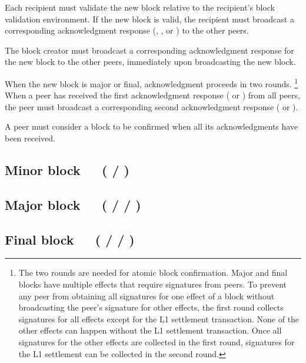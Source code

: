 \documentclass[../hydrozoa.tex]{subfiles}
\begin{document}
Each recipient must validate the new block relative to the recipient's block validation environment. If the new block is valid, the recipient must broadcast a corresponding acknowledgment response (, , or ) to the other peers.

The block creator must broadcast a corresponding acknowledgment response for the new block to the other peers, immediately upon broadcasting the new block.

When the new block is major or final, acknowledgment proceeds in two rounds.%
\footnote{The two rounds are needed for atomic block confirmation.
  Major and final blocks have multiple effects that require signatures from peers.
  To prevent any peer from obtaining all signatures for one effect of a block without broadcasting the peer's signature for other effects, the first round collects signatures for all effects except for the L1 settlement transaction.
  None of the other effects can happen without the L1 settlement transaction.
  Once all signatures for the other effects are collected in the first round, signatures for the L1 settlement can be collected in the second round.
  }
When a peer has received the first acknowledgment response ( or ) from all peers, the peer must broadcast a corresponding second acknowledgment response ( or ).

A peer must consider a block to be confirmed when all its acknowledgments have been received.

\subsection{Minor block~~~( / )}%
\label{h:l2-consensus-minor-block}%


\subsection{Major block~~~( /  / )}%
\label{h:l2-consensus-major-block}%


\subsection{Final block~~~( /  / )}%
\label{h:l2-consensus-final-block}%
\end{document}

